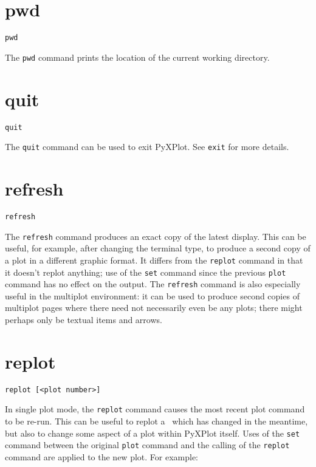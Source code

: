 \section{pwd}

\begin{verbatim}
pwd
\end{verbatim}

The {\tt pwd} command prints the location of the current working directory.



\section{quit}

\begin{verbatim}
quit
\end{verbatim}

The {\tt quit} command can be used to exit PyXPlot. See {\tt exit} for more
details.

\section{refresh}

\begin{verbatim}
refresh
\end{verbatim}

The {\tt refresh} command produces an exact copy of the latest display. This can
be useful, for example, after changing the terminal type, to produce a second
copy of a plot in a different graphic format. It differs from the {\tt replot}
command in that it doesn't replot anything; use of the {\tt set} command since
the previous {\tt plot} command has no effect on the output. The {\tt refresh}
command is also especially useful in the multiplot environment: it can be used
to produce second copies of multiplot pages where there need not necessarily
even be any plots; there might perhaps only be textual items and arrows.

\section{replot}

\begin{verbatim}
replot [<plot number>]
\end{verbatim}

In single plot mode, the {\tt replot} command causes the most recent plot
command to be re-run.  This can be useful to replot a \datafile\ which has changed
in the meantime, but also to change some aspect of a plot within PyXPlot itself.
Uses of the {\tt set} command between the original {\tt plot} command and the
calling of the {\tt replot} command are applied to the new plot. For example:

